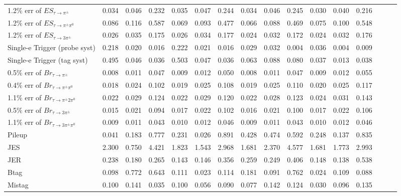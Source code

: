 \begin{sidewaystable}[p]
\begin{tabular}{|l|ccc|ccc|ccc|ccc|ccc|}
  1.2$\%$ err of $ES_{\tau\to\pi^\pm}$       & 0.034 & 0.046 & 0.232 & 0.035 & 0.047 & 0.244 & 0.034 & 0.046 & 0.245 & 0.030 & 0.040 & 0.216 \\ 
  1.2$\%$ err of $ES_{\tau\to\pi^\pm\pi^0}$  & 0.086 & 0.116 & 0.587 & 0.069 & 0.093 & 0.477 & 0.066 & 0.088 & 0.469 & 0.075 & 0.100 & 0.548 \\ 
  1.2$\%$ err of $ES_{\tau\to3\pi^\pm}$      & 0.026 & 0.035 & 0.175 & 0.026 & 0.034 & 0.177 & 0.024 & 0.032 & 0.172 & 0.024 & 0.032 & 0.176 \\ 
  Single-e Trigger (probe syst)              & 0.218 & 0.020 & 0.016 & 0.222 & 0.021 & 0.016 & 0.029 & 0.032 & 0.004 & 0.036 & 0.004 & 0.009 \\ 
  Single-e Trigger (tag syst)                & 0.495 & 0.046 & 0.036 & 0.503 & 0.047 & 0.036 & 0.063 & 0.088 & 0.080 & 0.037 & 0.013 & 0.038 \\ 
  0.5$\%$ err of $Br_{\tau\to\pi^\pm}$       & 0.008 & 0.011 & 0.047 & 0.009 & 0.012 & 0.050 & 0.008 & 0.011 & 0.047 & 0.009 & 0.012 & 0.055 \\ 
  0.4$\%$ err of $Br_{\tau\to\pi^\pm\pi^0}$  & 0.018 & 0.024 & 0.102 & 0.019 & 0.025 & 0.108 & 0.019 & 0.025 & 0.110 & 0.020 & 0.025 & 0.117 \\ 
  1.1$\%$ err of $Br_{\tau\to\pi^\pm2\pi^0}$ & 0.022 & 0.029 & 0.124 & 0.022 & 0.029 & 0.120 & 0.022 & 0.028 & 0.123 & 0.024 & 0.031 & 0.143 \\ 
  0.5$\%$ err of $Br_{\tau\to3\pi^\pm}$      & 0.015 & 0.021 & 0.094 & 0.017 & 0.022 & 0.102 & 0.016 & 0.021 & 0.100 & 0.017 & 0.022 & 0.106 \\ 
  1.1$\%$ err of $Br_{\tau\to3\pi^\pm\pi^0}$ & 0.009 & 0.011 & 0.043 & 0.010 & 0.012 & 0.046 & 0.009 & 0.011 & 0.043 & 0.010 & 0.012 & 0.046 \\ 
  Pileup                                     & 0.041 & 0.183 & 0.777 & 0.231 & 0.026 & 0.891 & 0.428 & 0.474 & 0.592 & 0.248 & 0.137 & 0.835 \\ 
  JES                                        & 2.300 & 0.750 & 4.421 & 1.823 & 1.543 & 2.968 & 1.681 & 2.370 & 4.577 & 1.681 & 1.773 & 2.993 \\ 
  JER                                        & 0.238 & 0.180 & 0.265 & 0.143 & 0.146 & 0.356 & 0.259 & 0.249 & 0.406 & 0.148 & 0.138 & 0.538 \\ 
  Btag                                       & 0.098 & 0.772 & 0.643 & 0.111 & 0.023 & 0.114 & 0.181 & 0.091 & 0.762 & 0.024 & 0.109 & 0.088 \\ 
  Mistag                                     & 0.100 & 0.141 & 0.035 & 0.100 & 0.056 & 0.090 & 0.077 & 0.142 & 0.124 & 0.030 & 0.096 & 0.135 \\ 

\end{tabular}
\end{sidewaystable}
